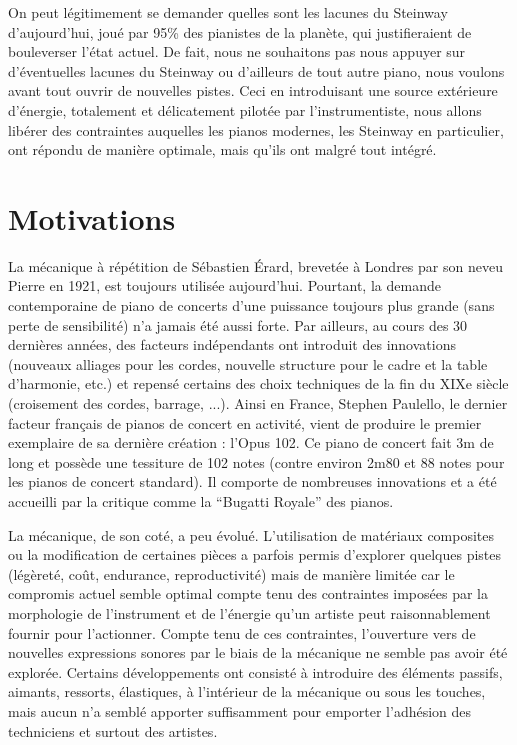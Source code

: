 \documentclass[french,a4paper,12pt]{report}
\begin{document}
\newpage
On peut légitimement se demander quelles sont les lacunes du Steinway d’aujourd’hui, joué par 95\% des pianistes de la planète, qui justifieraient de bouleverser l’état actuel.
De fait, nous ne souhaitons pas nous appuyer sur d’éventuelles lacunes du Steinway ou d’ailleurs de tout autre piano, nous voulons avant tout ouvrir de nouvelles pistes. 
 Ceci en introduisant une source extérieure d’énergie, totalement et délicatement pilotée par l’instrumentiste, nous allons libérer des contraintes auquelles les pianos modernes, les Steinway en particulier, ont répondu de manière optimale, mais qu’ils ont malgré tout intégré.
 
 \section{Motivations}
 
 La mécanique à répétition de Sébastien Érard, brevetée à Londres par son neveu Pierre en 1921, est toujours utilisée aujourd’hui. Pourtant, la demande contemporaine de piano de concerts d’une puissance toujours plus grande (sans perte de sensibilité) n’a jamais été aussi forte. Par ailleurs, au cours des 30 dernières années, des facteurs indépendants ont introduit des innovations (nouveaux alliages pour les cordes, nouvelle structure pour le cadre et la table d’harmonie, etc.) et repensé certains des choix techniques de la fin du XIXe siècle (croisement des cordes, barrage, ...). Ainsi en France, Stephen Paulello, le dernier facteur français de pianos de concert en activité, vient de produire le premier exemplaire de sa dernière création : l’Opus 102. Ce piano de concert fait 3m de long et possède une tessiture de 102 notes (contre environ 2m80 et 88 notes pour les pianos de concert standard). Il comporte de nombreuses innovations et a été accueilli par la critique comme la “Bugatti Royale” des pianos.

La mécanique, de son coté, a peu évolué. L’utilisation de matériaux composites ou la modification de certaines pièces a parfois permis d’explorer quelques pistes (légèreté, coût, endurance, reproductivité) mais de manière limitée car le compromis actuel semble optimal compte tenu des contraintes imposées par la morphologie de l’instrument et de l’énergie qu’un artiste peut raisonnablement fournir pour l’actionner. Compte tenu de ces contraintes, l’ouverture vers de nouvelles expressions sonores par le biais de la mécanique ne semble pas avoir été explorée. Certains développements ont consisté à introduire des éléments passifs, aimants, ressorts, élastiques, à l’intérieur de la mécanique ou sous les touches, mais aucun n’a semblé apporter suffisamment pour emporter l’adhésion des techniciens et surtout des artistes.\newline
\end{document}

